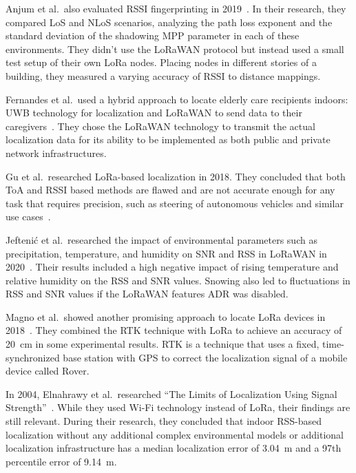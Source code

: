 Anjum et al.\ also evaluated \ac{RSSI} fingerprinting in 2019~\cite{anjum_analysis_2019}.
In their research, they compared \ac{LoS} and \ac{NLoS} scenarios, analyzing the path loss exponent and the standard deviation of the shadowing \ac{MPP} parameter in each of these environments.
They didn't use the \ac{LoRaWAN} protocol but instead used a small test setup of their own \ac{LoRa} nodes.
Placing nodes in different stories of a building, they measured a varying accuracy of \ac{RSSI} to distance mappings.
 
Fernandes et al.\ used a hybrid approach to locate elderly care recipients indoors: \ac{UWB} technology for localization and \ac{LoRaWAN} to send data to their caregivers~\cite{fernandes_hybrid_2020}.
They chose the \ac{LoRaWAN} technology to transmit the actual localization data for its ability to be implemented as both public and private network infrastructures.

Gu et al.\ researched \ac{LoRa}-based localization in 2018.
They concluded that both \ac{ToA} and \ac{RSSI} based methods are flawed and are not accurate enough for any task that requires precision, such as steering of autonomous vehicles and similar use cases~\cite{gu_lora-based_2018}.

Jeftenić et al.\ researched the impact of environmental parameters such as precipitation, temperature, and humidity on \ac{SNR} and \ac{RSS} in \ac{LoRaWAN} in 2020~\cite{jeftenic_impact_2020}.
Their results included a high negative impact of rising temperature and relative humidity on the \ac{RSS} and \ac{SNR} values.
Snowing also led to fluctuations in \ac{RSS} and \ac{SNR} values if the \ac{LoRaWAN} features \ac{ADR} was disabled.

Magno et al.\ showed another promising approach to locate \ac{LoRa} devices in 2018~\cite{magno_poster_2018}.
They combined the \acf{RTK} technique with \ac{LoRa} to achieve an accuracy of \SI{20}{\centi\meter} in some experimental results.
\ac{RTK} is a technique that uses a fixed, time-synchronized base station with \ac{GPS} to correct the localization signal of a mobile device called Rover.

In 2004, Elnahrawy et al.\ researched ``The Limits of Localization Using Signal Strength''~\cite{elnahrawy_limits_2004}.
While they used Wi-Fi technology instead of \ac{LoRa}, their findings are still relevant.
During their research, they concluded that indoor \ac{RSS}-based localization without any additional complex environmental models or additional localization infrastructure has a median localization error of \SI{3.04}{\meter} and a 97th percentile error of \SI{9.14}{\meter}.

